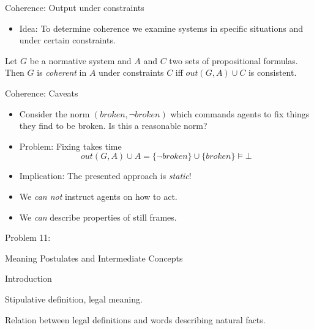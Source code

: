 \documentclass[]{beamer}
\begin{document}
\begin{frame}{Coherence: Output under constraints}
    \begin{itemize}
        \item Idea: To determine coherence we examine systems in specific situations and under certain constraints.
    \end{itemize}
    \begin{definition}
        Let $G$ be a normative system and $A$ and $C$ two sets of propositional formulas. Then $G$ is \emph{coherent} in $A$ under constraints $C$ iff $\mathit{out}(G,A) \cup C$ is consistent.
    \end{definition}
\end{frame}

\begin{frame}{Coherence: Caveats}
    \begin{itemize}
        \item Consider the norm $(\mathit{broken},\neg \mathit{broken})$ which commands agents to fix things they find to be broken. Is this a reasonable norm?
        \pause
        \item Problem: Fixing takes time
        \[\mathit{out}(G,A) \cup A = \{\neg \mathit{broken}\} \cup \{\mathit{broken}\} \models \bot\]
        \vspace*{-\baselineskip}\pause %
        \item Implication: The presented approach is \emph{static}!
        \item We \emph{can not} instruct agents on how to act.
        \item We \emph{can} describe properties of still frames.
    \end{itemize}
\end{frame}

\begin{frame}
    \centering\LARGE
    Problem 11:\par
    Meaning Postulates and Intermediate Concepts
\end{frame}

\begin{frame}{Introduction}
    \begin{definition}
    Stipulative definition, legal meaning.
    \end{definition}

    \begin{definition}
    Relation between legal definitions and words describing natural facts.
    \end{definition}
\end{frame}
\end{document}
